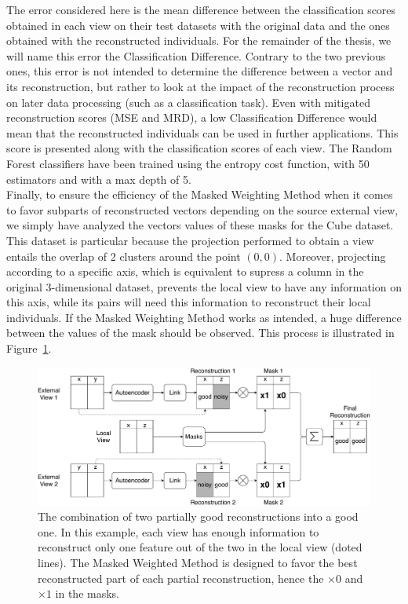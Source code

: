 The error considered here is the mean difference between the classification scores obtained in each view on their test datasets with the original data and the ones obtained with the reconstructed individuals. For the remainder of the thesis, we will name this error the Classification Difference. Contrary to the two previous ones, this error is not intended to determine the difference between a vector and its reconstruction, but rather to look at the impact of the reconstruction process on later data processing (such as a classification task). Even with mitigated reconstruction scores (MSE and MRD), a low Classification Difference would mean that the reconstructed individuals can be used in further applications. This score is presented along with the classification scores of each view. The Random Forest classifiers have been trained using the entropy cost function, with 50 estimators and with a max depth of 5.\\

Finally, to ensure the efficiency of the Masked Weighting Method when it comes to favor subparts of reconstructed vectors depending on the source external view, we simply have analyzed the vectors values of these masks for the Cube dataset. This dataset is particular because the projection performed to obtain a view entails the overlap of 2 clusters around the point $(0,0)$. Moreover, projecting according to a specific axis, which is equivalent to supress a column in the original 3-dimensional dataset, prevents the local view to have any information on this axis, while its pairs will need this information to reconstruct their local individuals. If the Masked Weighting Method works as intended, a huge difference between the values of the mask should be observed. This process is illustrated in Figure~\ref{fig:process_mwm}.

\begin{figure}[h]
    \centering
    \includegraphics[scale=.38]{img/process_mwm}
    \caption{The combination of two partially good reconstructions into a good one. In this example, each view has enough information to reconstruct only one feature out of the two in the local view (doted lines). The Masked Weighted Method is designed to favor the best reconstructed part of each partial reconstruction, hence the $\times 0$ and $\times 1$ in the masks.}
\label{fig:process_mwm}
\end{figure}
	
